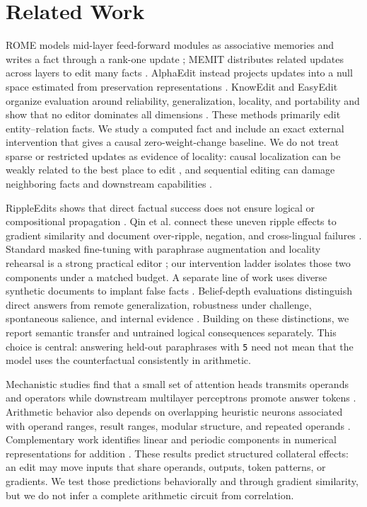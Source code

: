 \section{Related Work}
\label{sec:related}

ROME models mid-layer feed-forward modules as associative memories and writes a fact through a rank-one update \cite{meng2022rome}; MEMIT distributes related updates across layers to edit many facts \cite{meng2023memit}. AlphaEdit instead projects updates into a null space estimated from preservation representations \cite{fang2025alphaedit}. KnowEdit and EasyEdit organize evaluation around reliability, generalization, locality, and portability and show that no editor dominates all dimensions \cite{zhang2024knowedit}. These methods primarily edit entity--relation facts. We study a computed fact and include an exact external intervention that gives a causal zero-weight-change baseline. We do not treat sparse or restricted updates as evidence of locality: causal localization can be weakly related to the best place to edit \cite{hase2023localization}, and sequential editing can damage neighboring facts and downstream capabilities \cite{gupta2024catastrophic}.

RippleEdits shows that direct factual success does not ensure logical or compositional propagation \cite{cohen2024ripple}. Qin et al. connect these uneven ripple effects to gradient similarity and document over-ripple, negation, and cross-lingual failures \cite{qin2025messy}. Standard masked fine-tuning with paraphrase augmentation and locality rehearsal is a strong practical editor \cite{gangadhar2024finetuning}; our intervention ladder isolates those two components under a matched budget. A separate line of work uses diverse synthetic documents to implant false facts \cite{wang2025sdf}. Belief-depth evaluations distinguish direct answers from remote generalization, robustness under challenge, spontaneous salience, and internal evidence \cite{slocum2025believe}. Building on these distinctions, we report semantic transfer and untrained logical consequences separately. This choice is central: answering held-out paraphrases with \texttt{5} need not mean that the model uses the counterfactual consistently in arithmetic.

Mechanistic studies find that a small set of attention heads transmits operands and operators while downstream multilayer perceptrons promote answer tokens \cite{zhang2024arithmetic}. Arithmetic behavior also depends on overlapping heuristic neurons associated with operand ranges, result ranges, modular structure, and repeated operands \cite{nikankin2025arithmetic}. Complementary work identifies linear and periodic components in numerical representations for addition \cite{kantamneni2025trigonometry}. These results predict structured collateral effects: an edit may move inputs that share operands, outputs, token patterns, or gradients. We test those predictions behaviorally and through gradient similarity, but we do not infer a complete arithmetic circuit from correlation.

